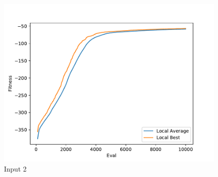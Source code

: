 \documentclass{standalone}
\begin{document}
\begin{figure}[!htb]
	\caption{Input 2}
	\label{fig:graph_2054}
	\includegraphics[width=\textwidth]{../graphs/graphs/2054.pdf}
\end{figure}
\end{document}
